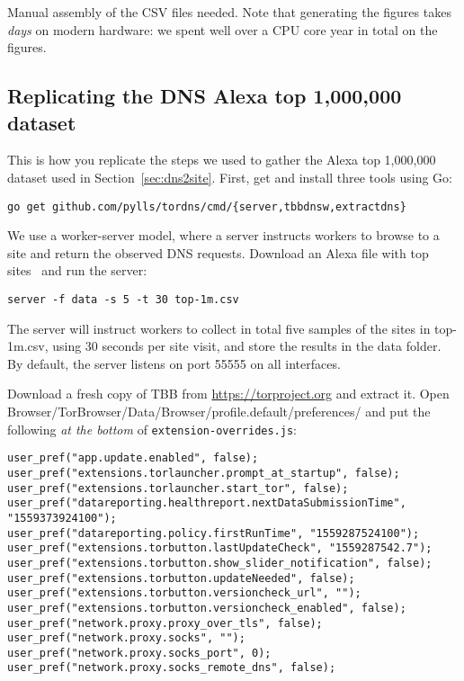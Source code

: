 Manual assembly of the CSV files needed.
Note that generating the figures takes \emph{days} on modern
hardware: we spent well over a CPU core year in total on the figures.

\subsection{Replicating the DNS Alexa top 1,000,000 dataset}
This is how you replicate the steps we used to gather the Alexa top 1,000,000
dataset used in Section~\ref{sec:dns2site}.
First, get and install three tools using Go:

\begin{lstlisting}
go get github.com/pylls/tordns/cmd/{server,tbbdnsw,extractdns}
\end{lstlisting}

We use a worker-server model, where a server instructs workers to browse to a
site and return the observed DNS requests. Download an Alexa file with top
sites~\cite{alexatop1k} and run the server:

\begin{lstlisting}
server -f data -s 5 -t 30 top-1m.csv
\end{lstlisting}
The server will instruct workers to collect in total
five samples of the sites in top-1m.csv, using 30 seconds per site visit,
and store the results in the data folder. By default, the server listens on
port 55555 on all interfaces.

Download a fresh copy of TBB from \url{https://torproject.org} and extract it.
Open Browser/TorBrowser/Data/Browser/profile.default/preferences/
and put the
following \emph{at the bottom} of \texttt{extension-overrides.js}:

\begin{lstlisting}
user_pref("app.update.enabled", false);
user_pref("extensions.torlauncher.prompt_at_startup", false);
user_pref("extensions.torlauncher.start_tor", false);
user_pref("datareporting.healthreport.nextDataSubmissionTime", "1559373924100");
user_pref("datareporting.policy.firstRunTime", "1559287524100");
user_pref("extensions.torbutton.lastUpdateCheck", "1559287542.7");
user_pref("extensions.torbutton.show_slider_notification", false);
user_pref("extensions.torbutton.updateNeeded", false);
user_pref("extensions.torbutton.versioncheck_url", "");
user_pref("extensions.torbutton.versioncheck_enabled", false);
user_pref("network.proxy.proxy_over_tls", false);
user_pref("network.proxy.socks", "");
user_pref("network.proxy.socks_port", 0);
user_pref("network.proxy.socks_remote_dns", false);
\end{lstlisting}


